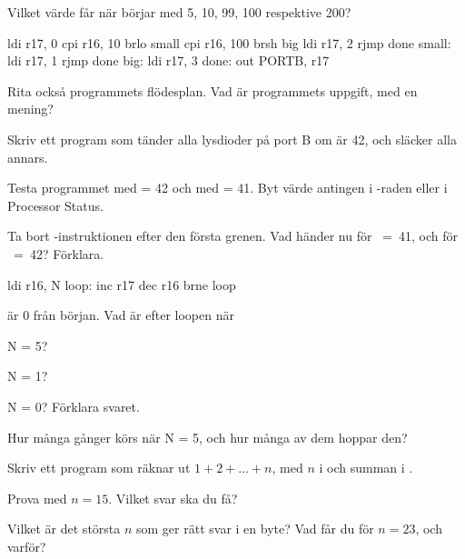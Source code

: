 \label{c9:ex:3}
Vilket värde får  när  börjar med 5, 10, 99, 100 respektive 200?

\begin{asmcode}
    ldi r17, 0
    cpi r16, 10
    brlo small
    cpi r16, 100
    brsh big
    ldi r17, 2
    rjmp done
small:
    ldi r17, 1
    rjmp done
big:
    ldi r17, 3
done:
    out PORTB, r17
\end{asmcode}

\noindent Rita också programmets flödesplan. Vad är programmets uppgift, med en mening?

\label{c9:ex:4}
\begin{parts}
  \item Skriv ett program som tänder alla lysdioder på port B om  är 42, och släcker
    alla annars.
  \item Testa programmet med  = 42 och med  = 41. Byt värde antingen i
    -raden eller i Processor Status.
  \item Ta bort -instruktionen efter den första grenen. Vad händer nu för
    ~=~41, och för ~=~42? Förklara.
\end{parts}

\label{c9:ex:5}

\begin{asmcode}
    ldi r16, N
loop:
    inc r17
    dec r16
    brne loop
\end{asmcode}

\noindent{} är 0 från början. Vad är  efter loopen när
\begin{parts}
  \item N = 5?
  \item N = 1?
  \item N = 0? Förklara svaret.
  \item Hur många gånger körs  när N = 5, och hur många av dem hoppar den?
\end{parts}

\label{c9:ex:6}
\begin{parts}
  \item Skriv ett program som räknar ut $1 + 2 + \dots + n$, med $n$ i  och summan i
    .
  \item Prova med $n = 15$. Vilket svar ska du få?
  \item Vilket är det största $n$ som ger rätt svar i en byte? Vad får du för $n = 23$, och
    varför?
\end{parts}

